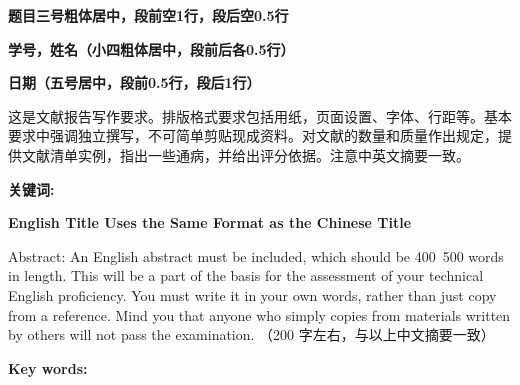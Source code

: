 \setcounter{page}{1} %

    \begin{center}
        \vspace{1ex}
        {\sanhao \bfseries 题目三号粗体居中，段前空1行，段后空0.5行}

        \vspace{3ex}
        {\xiaosihao \bfseries 学号，姓名（小四粗体居中，段前后各0.5行）}

        \vspace{2ex}
        {\wuhao \bfseries 日期（五号居中，段前0.5行，段后1行） }
        \vspace{2ex}

        \begin{changemargin}{1cm}{1cm}
            { 这是文献报告写作要求。排版格式要求包括用纸，页面设置、字体、行距等。基本要求中强调独立撰写，不可简单剪贴现成资料。对文献的数量和质量作出规定，提供文献清单实例，指出一些通病，并给出评分依据。注意中英文摘要一致。}

            {\xiaowuhao 
            {\bfseries 关键词:} }
        \end{changemargin}

        \vspace{3ex}
        {\sanhao \bfseries English Title Uses the Same Format as the Chinese Title}
        \begin{changemargin}{1cm}{1cm}
            { Abstract: An English abstract must be included, which should be 400~500 words in length. This will be a part of the basis for the assessment of your technical English proficiency. You must write it in your own words, rather than just copy from a reference. Mind you that anyone who simply copies from materials written by others will not pass the examination. （200 字左右，与以上中文摘要一致）}

            {\xiaowuhao 
            {\bfseries Key words:} }
        \end{changemargin}    

    \end{center}
    \vspace{2ex}

    